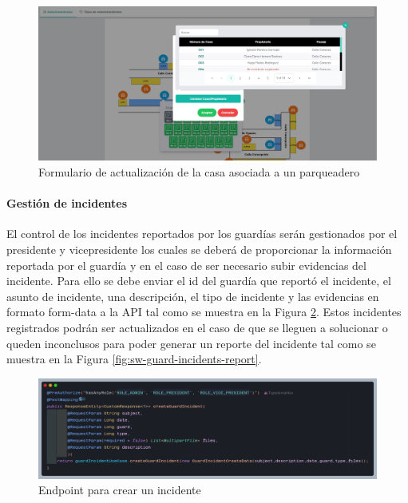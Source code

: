 \begin{figure}[H]
\centering
\includegraphics[width=1\textwidth]{resources/images/sw-parking-form}
\caption{Formulario de actualización de la casa asociada a un parqueadero}
\label{fig:sw-parking-form}
\end{figure}

\paragraph{Gestión de incidentes}

El control de los incidentes reportados por los guardías serán gestionados por el presidente y vicepresidente los cuales se deberá de proporcionar la información reportada por el guardía y en el caso de ser necesario subir evidencias del incidente.
Para ello se debe enviar el id del guardía que reportó el incidente, el asunto de incidente, una descripción, el tipo de incidente y las evidencias en formato form-data a la API tal como se muestra en la Figura \ref{fig:api-incident-create}.
Estos incidentes registrados podrán ser actualizados en el caso de que se lleguen a solucionar o queden inconclusos para poder generar un reporte del incidente tal como se muestra en la Figura \ref{fig:sw-guard-incidents-report}.

\begin{figure}[H]
    \centering
    \includegraphics[width=1\textwidth]{resources/images/api-guard-indicent-endpoint}
    \caption{Endpoint para crear un incidente}
    \label{fig:api-incident-create}
\end{figure}

